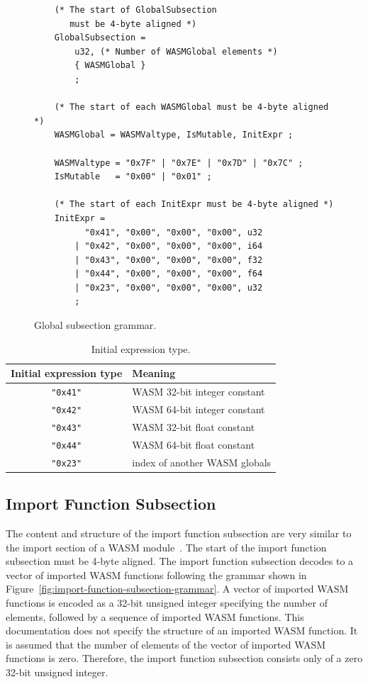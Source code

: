 \documentclass{article}
\begin{document}
\begin{figure}[H]
\begin{verbatim}
    (* The start of GlobalSubsection
       must be 4-byte aligned *)
    GlobalSubsection =
        u32, (* Number of WASMGlobal elements *)
        { WASMGlobal }
        ;

    (* The start of each WASMGlobal must be 4-byte aligned *)
    WASMGlobal = WASMValtype, IsMutable, InitExpr ;

    WASMValtype = "0x7F" | "0x7E" | "0x7D" | "0x7C" ;
    IsMutable   = "0x00" | "0x01" ;

    (* The start of each InitExpr must be 4-byte aligned *)
    InitExpr =
          "0x41", "0x00", "0x00", "0x00", u32
        | "0x42", "0x00", "0x00", "0x00", i64
        | "0x43", "0x00", "0x00", "0x00", f32
        | "0x44", "0x00", "0x00", "0x00", f64
        | "0x23", "0x00", "0x00", "0x00", u32
        ;
\end{verbatim}
\caption{Global subsection grammar.}
\label{fig:global-subsection-grammar}
\end{figure}

\begin{table}[H]
\centering
\begin{tabular}{cl}
    \hline
    Initial expression type & Meaning \\
    \hline
    \verb|"0x41"| & WASM 32-bit integer constant \\
    \verb|"0x42"| & WASM 64-bit integer constant \\
    \verb|"0x43"| & WASM 32-bit float constant \\
    \verb|"0x44"| & WASM 64-bit float constant \\
    \verb|"0x23"| & index of another WASM globals \\
    \hline
\end{tabular}
\caption{Initial expression type.}
\label{table:init-expr-type}
\end{table}

\subsection{Import Function Subsection}
The content and structure of the import function subsection are very similar to the import section of a WASM module~\cite[Sec.~5.5.5]{webassembly2019core}.
The start of the import function subsection must be 4-byte aligned.
The import function subsection decodes to a vector of imported WASM functions following the grammar shown in Figure~\ref{fig:import-function-subsection-grammar}.
A vector of imported WASM functions is encoded as a 32-bit unsigned integer specifying the
number of elements, followed by a sequence of imported WASM functions.
This documentation does not specify the structure of an imported WASM function.
It is assumed that the number of elements of the vector of imported WASM functions is zero.
Therefore, the import function subsection consists only of a zero 32-bit unsigned integer.
\end{document}
